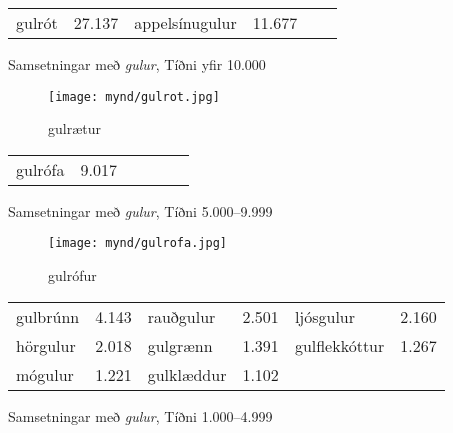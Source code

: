 \documentclass[../samsetningasafn.tex]{subfiles}
\begin{document}
\begin{wordlist}[H]
\begin{tcolorbox}

	\setlength{\extrarowheight}{3pt} 
	\begin{tabular}{BlBlBl}
		gulrót 		& 27.137		& 
		appelsínugulur & 11.677		&  	
					&
	\end{tabular}

\end{tcolorbox}
	\caption{Samsetningar með \textit{gulur}, Tíðni yfir 10.000}
	\label{listi:gult.10000}
\end{wordlist}	

\begin{figure}[H]
\begin{tcolorbox}
\centering
	\texttt{[image: mynd/gulrot.jpg]}
\end{tcolorbox}
	\caption{gulrætur}
	\label{mynd:gulrot}
\end{figure}
		
	\begin{wordlist}[H]
\begin{tcolorbox}

	\setlength{\extrarowheight}{3pt}
	\begin{tabular}{BlBlBl}	
		gulrófa		& 9.017		& 	
					&			&
					&
	\end{tabular}

\end{tcolorbox}
	\caption{Samsetningar með \textit{gulur}, Tíðni 5.000--9.999}
	\label{listi:gult.5000}
\end{wordlist}

\begin{figure}[H]
\begin{tcolorbox}
\centering
	\texttt{[image: mynd/gulrofa.jpg]}
\end{tcolorbox}
	\caption{gulrófur}
	\label{mynd:gulrofa}
\end{figure}

\begin{wordlist}[H]
\begin{tcolorbox}

	\setlength{\extrarowheight}{4pt}
	\begin{tabular}{BlBlBl}	
		gulbrúnn	& 4.143		& 
		rauðgulur	& 2.501		&  
		ljósgulur		& 2.160		\\ 	
		hörgulur		& 2.018		& 	
		gulgrænn	& 1.391		& 	
		gulflekkóttur	& 1.267		\\ 	
		mógulur		& 1.221		& 	
		gulklæddur	& 1.102		& 	
					&
	\end{tabular}

\end{tcolorbox}
	\caption{Samsetningar með \textit{gulur}, Tíðni 1.000--4.999}
	\label{listi:gult.1000}
\end{wordlist}
\end{document}
